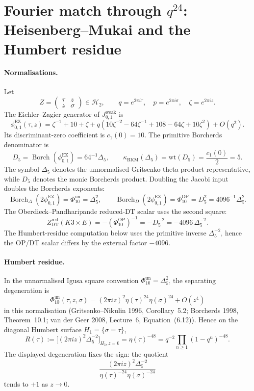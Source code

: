 \providecommand{\Vir}{\mathrm{Vir}}
\providecommand{\Muk}{\mathrm{Muk}}
\providecommand{\sltwo}{\mathfrak{sl}_2}
\providecommand{\Heis}{\mathrm{Heis}}
\providecommand{\DS}{H^{0}_{\mathrm{DS}}}
\providecommand{\Eone}{E_1}
\providecommand{\Etwo}{E_2}
\providecommand{\EZ}{\mathrm{EZ}}
\providecommand{\Dfive}{D_5}
\providecommand{\PhiTen}{\Phi_{10}}
\providecommand{\PhiUn}{\Phi_{10}^{\mathrm{un}}}
\providecommand{\PhiOP}{\Phi_{10}^{\mathrm{OP}}}

\section{Fourier match through $q^{24}$: Heisenberg--Mukai and the Humbert residue}
\label{wn:sec:fourier-match-q24}

\paragraph{Normalisations.}
Let
\[
  Z = \begin{pmatrix}\tau & z\\ z & \sigma\end{pmatrix}\in\mathcal H_2,
  \qquad
  q=e^{2\pi i\tau},\quad p=e^{2\pi i\sigma},\quad
  \zeta=e^{2\pi i z}.
\]
The Eichler--Zagier generator of \(J_{0,1}^{\mathrm{weak}}\) is
\[
  \phi_{0,1}^{\EZ}(\tau,z)
  =
  \zeta^{-1}+10+\zeta
  +q(10\zeta^{-2}-64\zeta^{-1}+108-64\zeta+10\zeta^2)
  +O(q^2).
\]
Its discriminant-zero coefficient is \(c_1(0)=10\). The primitive
Borcherds denominator is
\[
  \Dfive=\operatorname{Borch}(\phi_{0,1}^{\EZ})
  =64^{-1}\Delta_5,\qquad
  \kappa_{\mathrm{BKM}}(\Delta_5)
  =\mathrm{wt}(\Dfive)=\frac{c_1(0)}{2}=5.
\]
The symbol \(\Delta_5\) denotes the unnormalised Gritsenko theta-product
representative, while \(\Dfive\) denotes the monic Borcherds product.
Doubling the Jacobi input doubles the Borcherds exponents:
\[
  \operatorname{Borch}_{\Delta}(2\phi_{0,1}^{\EZ})
  =\PhiUn=\Delta_5^2,\qquad
  \operatorname{Borch}_{D}(2\phi_{0,1}^{\EZ})
  =\PhiOP=\Dfive^2=4096^{-1}\Delta_5^2.
\]
The Oberdieck--Pandharipande reduced-DT scalar uses the second square:
\[
  Z^{\mathrm{red}}_{\mathrm{DT}}(K3\times E)
  =-(\PhiOP)^{-1}
  =-\Dfive^{-2}
  =-4096\,\Delta_5^{-2}.
\]
The Humbert-residue computation below uses the primitive inverse
\(\Delta_5^{-2}\), hence the OP/DT scalar differs by the external
factor \(-4096\).

\paragraph{Humbert residue.}
In the unnormalised Igusa square convention \(\PhiUn=\Delta_5^2\), the
separating degeneration is
\[
  \PhiUn(\tau,z,\sigma)
  =
  (2\pi i z)^2\eta(\tau)^{24}\eta(\sigma)^{24}+O(z^4)
\]
in this normalisation (Gritsenko--Nikulin 1996, Corollary~5.2;
Borcherds 1998, Theorem~10.1; van der Geer 2008, Lecture~6,
Equation~(6.12)). Hence on the diagonal Humbert surface
$H_1=\{\sigma=\tau\}$,
\[
  R(\tau)
  :=
  \bigl[(2\pi i z)^2\Delta_5^{-2}\bigr]_{H_1,z=0}
  =
  \eta(\tau)^{-48}
  =
  q^{-2}\prod_{n\geq 1}(1-q^n)^{-48}.
\]
The displayed degeneration fixes the sign: the quotient
\[
  \frac{(2\pi i z)^2\Delta_5^{-2}}
       {\eta(\tau)^{-24}\eta(\sigma)^{-24}}
\]
tends to \(+1\) as \(z\to0\).

